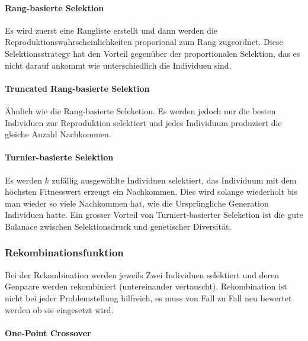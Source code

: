       \paragraph{Rang-basierte Selektion}

        Es wird zuerst eine Rangliste erstellt und dann werden die Reproduktionswahrscheinlichkeiten proporional zum Rang zugeordnet.
        Diese Selektionsstrategy hat den Vorteil gegenüber der proportionalen Selektion,
        das es nicht darauf ankommt wie unterschiedlich die Individuen sind.

      \paragraph{Truncated Rang-basierte Selektion}

        Ähnlich wie die Rang-basierte Seleketion.
        Es werden jedoch nur die besten Individuen zur Reproduktion selektiert und
        jedes Individuum produziert die gleiche Anzahl Nachkommen.

      \paragraph{Turnier-basierte Selektion\label{par:Turnier}}

        Es werden \(k\) zufällig ausgewählte Individuen selektiert,
        das Individuum mit dem höchsten Fitnesswert erzeugt ein Nachkommen.
        Dies wird solange wiederholt bis man wieder so viele Nachkommen hat,
        wie die Ursprüngliche Generation Individuen hatte.
        Ein grosser Vorteil von Turniert-basierter Seleketion ist die gute Balanace zwischen
        Selektionsdruck und genetischer Diversität.

    \subsubsection{Rekombinationsfunktion}

        Bei der Rekombination werden jeweils Zwei Individuen selektiert und
        deren Genpaare werden rekombiniert (untereinander vertauscht).
        Rekombination ist nicht bei jeder Problemstellung hilfreich,
        es muss von Fall zu Fall neu bewertet werden ob sie eingesetzt wird.

        \paragraph{One-Point Crossover}

